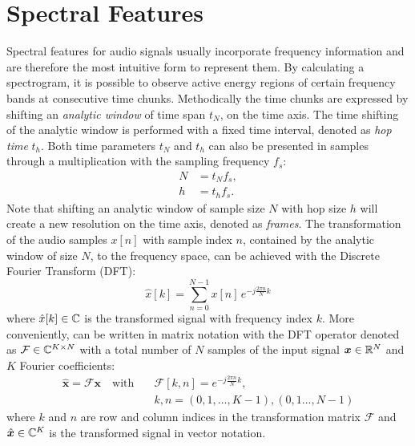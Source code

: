 
\section{Spectral Features}\label{sec:signal_spec}
Spectral features for audio signals usually incorporate frequency information and are therefore the most intuitive form to represent them.
By calculating a spectrogram, it is possible to observe active energy regions of certain frequency bands at consecutive time chunks.
Methodically the time chunks are expressed by shifting an \emph{analytic window} of time span $t_N$, on the time axis.
The time shifting of the analytic window is performed with a fixed time interval, denoted as \emph{hop time} $t_{h}$.
Both time parameters $t_N$ and $t_h$ can also be presented in samples through a multiplication with the sampling frequency $f_s$:
\begin{equation}
  \begin{split}
    N &= t_N f_s, \\
    h &= t_h f_s.
  \end{split}
\end{equation}
Note that shifting an analytic window of sample size $N$ with hop size $h$ will create a new resolution on the time axis, denoted as \emph{frames}.
The transformation of the audio samples $x[n]$ with sample index $n$, contained by the analytic window of size $N$, to the frequency space, can be achieved with the Discrete Fourier Transform (DFT):
\begin{equation}\label{eq:signal_spec_dtft}
  \hat{x}[k] = \sum_{n=0}^{N-1} x[n] \, e^{-j\frac{2 \pi n}{N}k}
\end{equation}
where $\hat{x}[k] \in \mathbb{C}$ is the transformed signal with frequency index $k$.
More conveniently,  can be written in matrix notation with the DFT operator denoted as $\mathcal{F} \in \mathbb{C}^{K \times N}$ with a total number of $N$ samples of the input signal $\bm{x} \in \mathbb{R}^N$ and $K$ Fourier coefficients:
\begin{equation}\label{eq:signal_spec_dtft_matrix}
  \begin{aligned}
    \hat{\bm{x}} = \mathcal{F} \bm{x} \quad \mathrm{with} 
    \quad &\mathcal{F}[k, n] = e^{-j\frac{2 \pi n}{N} k},\\
    &k, n = (0, 1, \dots, K-1), (0, 1 \dots, N-1)
  \end{aligned}
\end{equation}
where $k$ and $n$ are row and column indices in the transformation matrix $\mathcal{F}$ and $\hat{\bm{x}} \in \mathbb{C}^K$ is the transformed signal in vector notation.

